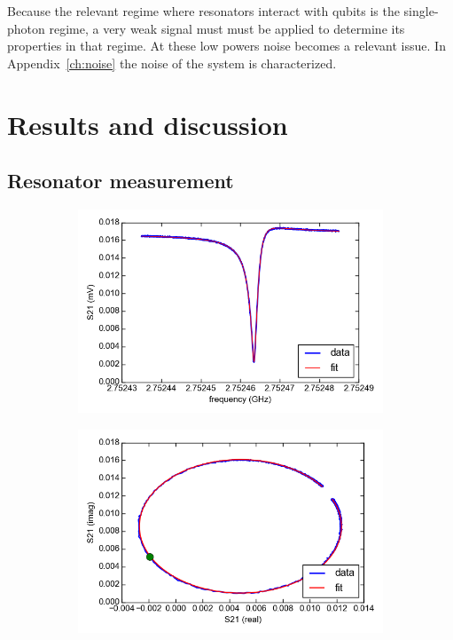   Because the relevant regime where resonators interact with qubits is the single-photon regime, a very weak signal must must be applied to determine its properties in that regime. At these low powers noise becomes a relevant issue. In Appendix~\ref{ch:noise} the noise of the system is characterized.

\chapter{Results and discussion}
\label{ch:Results and discussion}


\section{Resonator measurement}

\begin{figure}[h]
    \centering
    \begin{subfigure}[b]{.49\textwidth}
        \label{fig:resonator_amplitude}
        \includegraphics[width=\textwidth]{Figures/DRIE/resonator_amplitude.png}
    \end{subfigure}
    \begin{subfigure}[b]{.49\textwidth}
        \label{fig:resonator_complex}
        \includegraphics[width=\textwidth]{Figures/DRIE/resonator_complex.png}

\end{subfigure}
\end{figure}

